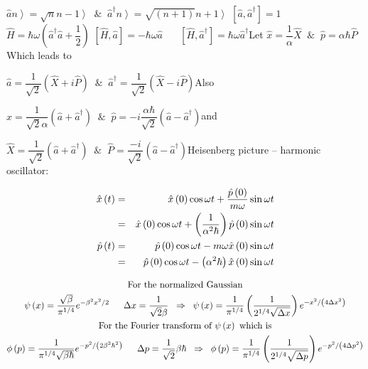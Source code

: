 \documentclass{article}
\begin{document}
$\hat{a} \left. n \right\rangle =\sqrt{n} \left. n-1 \right\rangle \;\;\&\;\;%
\hat{a} ^{\dag } \left. n \right\rangle =\sqrt{\left( n+1\right) } \left.
n+1 \right\rangle $ $\left[ \hat{a} ,\hat{a} ^{\dag } \right] =1$ $\hat{H}
=\hbar \omega \left( \hat{a} ^{\dag } \hat{a} +\dfrac{1}{2} \right) $ $\left[
\hat{H} ,\hat{a} \right] =-\hbar \omega \hat{a} \quad\;\;\,\left[ \hat{H} ,%
\hat{a} ^{\dag } \right] =\hbar \omega \hat{a} ^{\dag } $Let $\hat{x} =%
\dfrac{1}{\alpha } \hat{X} \;\;\&\;\;\hat{p} =\alpha \hbar \hat{P} $Which
leads to

$\hat{a} =\dfrac{1}{\sqrt{2} } \left( \hat{X} +i\hat{P} \right) \;\;\&\;\;%
\hat{a} ^{\dag } =\dfrac{1}{\sqrt{2} } \left( \hat{X} -i\hat{P} \right) $Also

$\hat{x} =\dfrac{1}{\sqrt{2} \alpha } \left( \hat{a} +\hat{a} ^{\dag }
\right) \;\;\&\;\;\hat{p} =-i\dfrac{\alpha \hbar }{\sqrt{2} } \left( \hat{a}
-\hat{a} ^{\dag } \right) $and

$\hat{X} =\dfrac{1}{\sqrt{2} } \left( \hat{a} +\hat{a} ^{\dag } \right)
\;\;\&\;\;\hat{P} =\dfrac{-i}{\sqrt{2} } \left( \hat{a} -\hat{a} ^{\dag }
\right) $Heisenberg picture -- harmonic oscillator:

\begin{eqnarray*}
\hat{x} \left( t\right) & = & \hat{x} \left( 0\right) \cos \omega t+\dfrac{%
\hat{p} \left( 0\right) }{m\omega } \sin \omega t \\
& = & \hat{x} \left( 0\right) \cos \omega t+\left( \dfrac{1}{\alpha ^{2}
\hbar } \right) \hat{p} \left( 0\right) \sin \omega t \\
\hat{p} \left( t\right) & = & \hat{p} \left( 0\right) \cos \omega t-m\omega 
\hat{x} \left( 0\right) \sin \omega t \\
& = & \hat{p} \left( 0\right) \cos \omega t-\left( \alpha ^{2} \hbar \right) 
\hat{x} \left( 0\right) \sin \omega t
\end{eqnarray*}

\begin{gather*}
\text{For\ the\ normalized\ Gaussian} \\
\psi \left( x\right) =\dfrac{\sqrt{\beta } }{\pi ^{1/4} } e^{-\beta ^{2}
x^{2} /2} \quad\;\;\Delta x=\dfrac{1}{\sqrt{2} \beta } \;\;\Rightarrow
\;\;\psi \left( x\right) =\dfrac{1}{\pi ^{1/4} } \left( \dfrac{1}{2^{1/4} 
\sqrt{\Delta x} } \right) e^{-x^{2} /\left( 4\Delta x^{2} \right) } \\
\text{For\ the\ Fourier\ transform\ of\ } \psi \left( x\right) \text{\
which\ is} \\
\phi \left( p\right) =\dfrac{1}{\pi ^{1/4} \sqrt{\beta \hbar } } e^{-p^{2}
/\left( 2\beta ^{2} \hbar ^{2} \right) } \quad\;\;\Delta p=\dfrac{1}{\sqrt{2}
} \beta \hbar \;\;\Rightarrow \;\;\phi \left( p\right) =\dfrac{1}{\pi ^{1/4} 
} \left( \dfrac{1}{2^{1/4} \sqrt{\Delta p} } \right) e^{-p^{2} /\left(
4\Delta p^{2} \right) }
\end{gather*}
\end{document}
